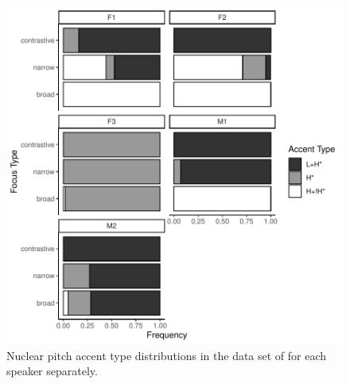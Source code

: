 \begin{figure}[t]
\includegraphics[width=\textwidth]{figures/ch4/Grice_etal_PA_Types_Speakers.pdf}
\caption{Nuclear pitch accent type distributions in the data set of \citet{Griceetal2017} for each speaker separately.}
\label{fig:grice_etal_2017_PA_types_speakers}
\end{figure}

